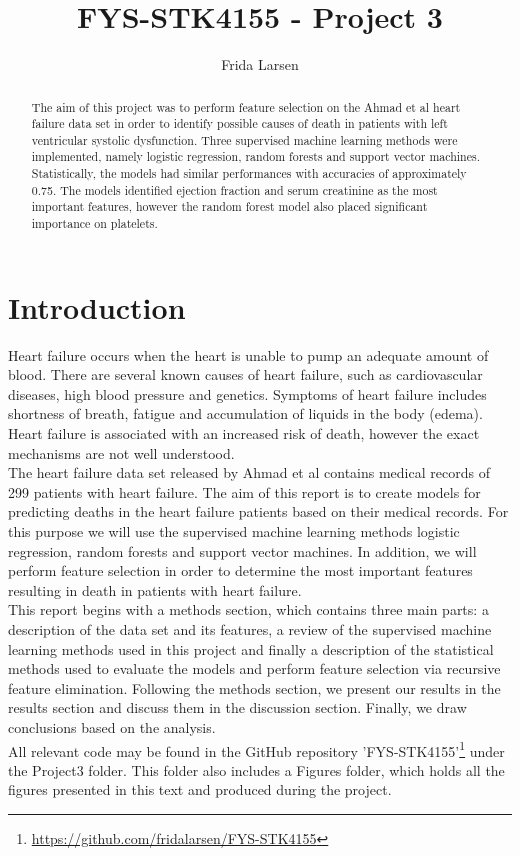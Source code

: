 \documentclass[notitlepage, reprint, nofootinbib]{revtex4-1}
\begin{document}
\title{FYS-STK4155 - Project 3}
\author{Frida Larsen}

\begin{abstract}
The aim of this project was to perform feature selection on the Ahmad et al heart failure data set \cite{dataset_article} in order to identify possible causes of death in patients with left ventricular systolic dysfunction. Three supervised machine learning methods were implemented, namely logistic regression, random forests and support vector machines. Statistically, the models had similar performances with accuracies of approximately 0.75. The models identified ejection fraction and serum creatinine as the most important features, however the random forest model also placed significant importance on platelets. 
\end{abstract}

\maketitle

\section{Introduction}
Heart failure occurs when the heart is unable to pump an adequate amount of blood. \cite{snl_hjertesvikt} There are several known causes of heart failure, such as cardiovascular diseases, high blood pressure and genetics. Symptoms of heart failure includes shortness of breath, fatigue and accumulation of liquids in the body (edema). Heart failure is associated with an increased risk of death, however the exact mechanisms are not well understood. \cite{forskning_no}\\[2mm]
The heart failure data set released by Ahmad et al \cite{dataset_article}\cite{kaggle} contains medical records of 299 patients with heart failure. The aim of this report is to create models for predicting deaths in the heart failure patients based on their medical records. For this purpose we will use the supervised machine learning methods logistic regression, random forests and support vector machines. In addition, we will perform feature selection in order to determine the most important features resulting in death in patients with heart failure. \\[2mm]
This report begins with a methods section, which contains three main parts: a description of the data set and its features, a review of the supervised machine learning methods used in this project and finally a description of the statistical methods used to evaluate the models and perform feature selection via recursive feature elimination. Following the methods section, we present our results in the results section and discuss them in the discussion section. Finally, we draw conclusions based on the analysis. \\[2mm]
All relevant code may be found in the GitHub repository 'FYS-STK4155'\footnote{\href{GitHub Repository}{https://github.com/fridalarsen/FYS-STK4155}} under the Project3 folder. This folder also includes a Figures folder, which holds all the figures presented in this text and produced during the project.
\end{document}
